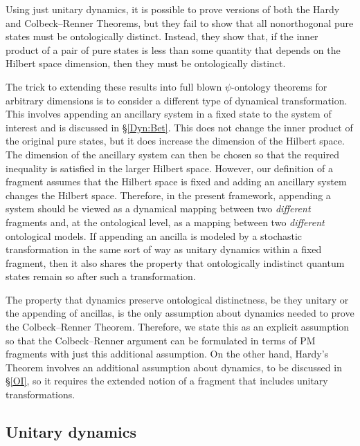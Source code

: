 \documentclass[DIV=calc,paper=a4,fontsize=11pt,twocolumn]{scrartcl} %
\theoremstyle{definition}
\theoremstyle{plain}
\begin{document}
Using just unitary dynamics, it is possible to prove versions of both
the Hardy and Colbeck--Renner Theorems, but they fail to show that all
nonorthogonal pure states must be ontologically distinct.  Instead,
they show that, if the inner product of a pair of pure states is less
than some quantity that depends on the Hilbert space dimension, then
they must be ontologically distinct.

The trick to extending these results into full blown $\psi$-ontology
theorems for arbitrary dimensions is to consider a different type of
dynamical transformation.  This involves appending an ancillary system
in a fixed state to the system of interest and is discussed in
\S\ref{Dyn:Bet}.  This does not change the inner product of the
original pure states, but it does increase the dimension of the
Hilbert space.  The dimension of the ancillary system can then be
chosen so that the required inequality is satisfied in the larger
Hilbert space.  However, our definition of a fragment assumes that the
Hilbert space is fixed and adding an ancillary system changes the
Hilbert space.  Therefore, in the present framework, appending a
system should be viewed as a dynamical mapping between two
\emph{different} fragments and, at the ontological level, as a mapping
between two \emph{different} ontological models.  If appending an
ancilla is modeled by a stochastic transformation in the same sort of
way as unitary dynamics within a fixed fragment, then it also shares
the property that ontologically indistinct quantum states remain so
after such a transformation.

The property that dynamics preserve ontological distinctness, be
they unitary or the appending of ancillas, is the only assumption
about dynamics needed to prove the Colbeck--Renner Theorem.  Therefore,
we state this as an explicit assumption so that the Colbeck--Renner
argument can be formulated in terms of PM fragments with just this
additional assumption.  On the other hand, Hardy's Theorem involves an
additional assumption about dynamics, to be discussed in \S\ref{OI},
so it requires the extended notion of a fragment that includes unitary
transformations.

\subsection{Unitary dynamics}

\label{Dyn:With}
\end{document}
